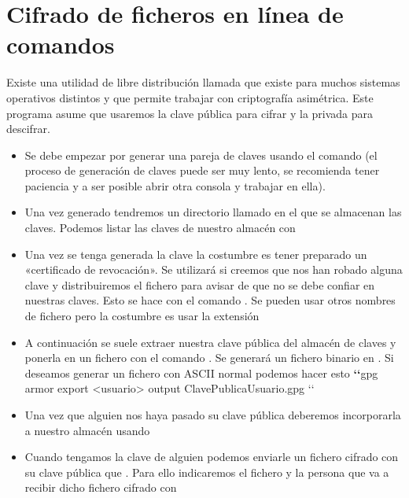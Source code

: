 \documentclass[letterpaper,10pt,spanish]{sphinxmanual}
\begin{document}
\section{Cifrado de ficheros en línea de comandos}
\label{\detokenize{tema_pautas_seguridad_informatica/tema_pautas_seguridad_informatica:cifrado-de-ficheros-en-linea-de-comandos}}
Existe una utilidad de libre distribución llamada  que existe para muchos sistemas operativos distintos y que permite trabajar con criptografía asimétrica. Este programa asume que usaremos la clave pública para cifrar y la privada para descifrar.
\begin{itemize}
\item {} 
Se debe empezar por generar una pareja de claves usando el comando  (el proceso de generación de claves puede ser muy lento, se recomienda tener paciencia y a ser posible abrir otra consola y trabajar en ella).

\item {} 
Una vez generado tendremos un directorio llamado  en el que se almacenan las claves. Podemos listar las claves de nuestro almacén con 

\item {} 
Una vez se tenga generada la clave la costumbre es tener preparado un «certificado de revocación». Se utilizará si creemos que nos han robado alguna clave y distribuiremos el fichero para avisar de que no se debe confiar en nuestras claves. Esto se hace con el comando  . Se pueden usar otros nombres de fichero pero la costumbre es usar la extensión 

\item {} 
A continuación se suele extraer nuestra clave pública del almacén de claves y ponerla en un fichero con el comando  . Se generará un fichero binario en  . Si deseamos generar un fichero con ASCII normal podemos hacer esto {\color{red}\bfseries{}{}`{}`}gpg \textendash{}armor \textendash{}export \textless{}usuario\textgreater{} \textendash{}output ClavePublicaUsuario.gpg {}`{}`

\item {} 
Una vez que alguien nos haya pasado su clave pública deberemos incorporarla a nuestro almacén usando 

\item {} 
Cuando tengamos la clave de alguien podemos enviarle un fichero cifrado con su clave pública que  . Para ello indicaremos el fichero y la persona que va a recibir dicho fichero cifrado con 

\end{itemize}
\end{document}
